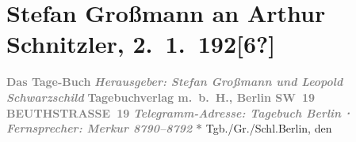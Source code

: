 

         
         \renewcommand{\erwaehntePersonen}{Personen: Stefan Großmann, Leopold Schwarzschild}
         \renewcommand{\erwaehnteInstitutionen}{Institutionen: Das Tage-Buch}
         \renewcommand{\erwaehnteOrte}{Orte: Berlin, Beuthstrasse, Sternwartestraße, Wien, XVIII., Währing}
         \renewcommand{\erwaehnteWerke}{}
               \section[Stefan Großmann an Arthur Schnitzler, 2. 1. 192{[}6?{]}]{ Stefan Großmann an Arthur Schnitzler, 2. 1. 192{[}6?{]}}\nopagebreak{}\rehead{ }\begin{ledgroupsized}[t]{13cm}\normalsize\beginnumbering \toendnotes[C]{\smallbreak\pagebreak[2]} 
\toendnotes[C]{\smallbreak}\pstart
           \noindent{}\centering{}{\pb}\textcolor{gray}{\textbf{Das Tage-Buch}}\pend
           \pstart
           \noindent{}\centering{}\textcolor{gray}{\textbf{\emph{Herausgeber: Stefan Großmann und Leopold Schwarzschild}}}\pend
           \pstart
           \noindent{}\centering{}\textcolor{gray}{\textbf{Tagebuchverlag m. b. H., Berlin SW 19}}\pend
           \pstart
           \noindent{}\centering{}\textcolor{gray}{\textbf{BEUTHSTRASSE 19}}\pend
           \pstart
           \noindent{}\centering{}\textcolor{gray}{\textbf{\emph{Telegramm-Adresse: Tagebuch Berlin ⋅ Fernsprecher: Merkur 8790–8792}}}\pend
           \pstart
           \noindent{}\centering{}\textcolor{gray}{\textbf{\emph{}}}\pend
           \pstart
           \noindent{}\centering{}\textcolor{gray}{\textbf{*}}\pend
           \pstart
           \noindent{}Tgb./Gr./Schl.\hfill Berlin, den \label{K_L02464-1v}
\end{ledgroupsized}
